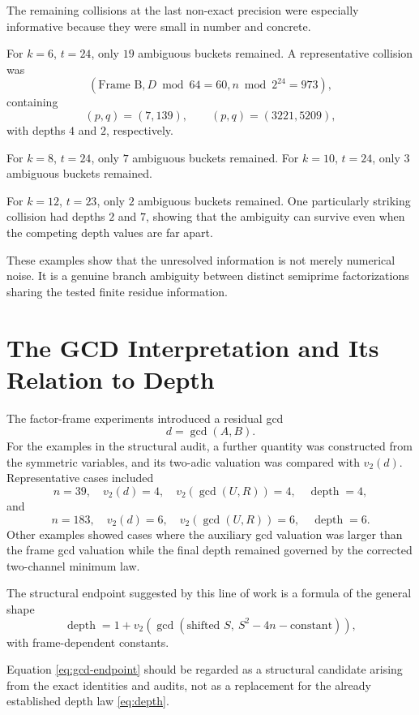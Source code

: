 \documentclass[11pt,a4paper]{article}
\begin{document}
The remaining collisions at the last non-exact precision were especially informative because they were small in number and concrete.

For $k=6$, $t=24$, only $19$ ambiguous buckets remained.  A representative collision was
\[
(\text{Frame B},D\bmod64=60,n\bmod2^{24}=973),
\]
containing
\[
(p,q)=(7,139),
\qquad
(p,q)=(3221,5209),
\]
with depths $4$ and $2$, respectively.

For $k=8$, $t=24$, only $7$ ambiguous buckets remained.  For $k=10$, $t=24$, only $3$ ambiguous buckets remained.

For $k=12$, $t=23$, only $2$ ambiguous buckets remained.  One particularly striking collision had depths $2$ and $7$, showing that the ambiguity can survive even when the competing depth values are far apart.

These examples show that the unresolved information is not merely numerical noise.  It is a genuine branch ambiguity between distinct semiprime factorizations sharing the tested finite residue information.

\section{The GCD Interpretation and Its Relation to Depth}

The factor-frame experiments introduced a residual gcd
\[
 d=\gcd(A,B).
\]
For the examples in the structural audit, a further quantity was constructed from the symmetric variables, and its two-adic valuation was compared with $v_2(d)$.  Representative cases included
\[
 n=39,
 \quad v_2(d)=4,
 \quad v_2(\gcd(U,R))=4,
 \quad \operatorname{depth}=4,
\]
and
\[
 n=183,
 \quad v_2(d)=6,
 \quad v_2(\gcd(U,R))=6,
 \quad \operatorname{depth}=6.
\]
Other examples showed cases where the auxiliary gcd valuation was larger than the frame gcd valuation while the final depth remained governed by the corrected two-channel minimum law.

The structural endpoint suggested by this line of work is a formula of the general shape
\begin{equation}
 \operatorname{depth}
 =1+v_2\!\left(\gcd(\text{shifted }S,\ S^2-4n-\text{constant})\right),
 \label{eq:gcd-endpoint}
\end{equation}
with frame-dependent constants.

Equation \eqref{eq:gcd-endpoint} should be regarded as a structural candidate arising from the exact identities and audits, not as a replacement for the already established depth law \eqref{eq:depth}.
\end{document}
